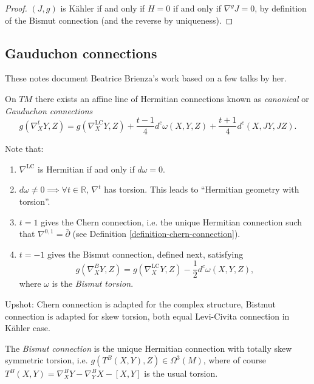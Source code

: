 \begin{proof}
$(J,g)$ is Kähler if and only if $H=0$
if and only if $\nabla^g J=0$,
by definition of the Bismut connection (and
the reverse by uniqueness).
\end{proof}




\subsection{Gauduchon connections}
\label{subsection-gauduchon-connections}

These notes document Beatrice Brienza's
work based on a few talks by her.

\begin{theorem}[Gauduchon]
\label{theorem-gauduchon-connections}
On $TM$ there exists an affine line
of Hermitian connections known as
{\it canonical} or
{\it Gauduchon connections}
$$
g(\nabla_X^tY,Z)
=g(\nabla_X^{\text{LC}}Y,Z)
+\frac{t-1}{4}
d^c\omega(X,Y,Z)
+\frac{t+1}{4}
d^c(X,JY,JZ).
$$
\end{theorem}

\noindent
Note that:
\begin{enumerate}
\item $\nabla^{\text{LC}}$ is Hermitian
if and only if $d \omega=0$.
\item $d \omega \neq 0 \implies
\forall t \in \mathbb{R}$,
$\nabla^t$ has torsion. This leads to
``Hermitian geometry with torsion''.
\item $t=1$ gives the Chern connection,
i.e. the unique Hermitian connection
such that $\nabla^{0,1}=\bar\partial$
(see Definition
\ref{definition-chern-connection}).
\item $t=-1$ gives the Bismut connection,
defined next, satisfying
$$
g(\nabla_X^BY,Z)
=g(\nabla^{\text{LC}}_XY,Z)
-\frac{1}{2}d^c\omega(X,Y,Z),
$$
where $\omega$ is the {\it Bismut torsion}.
\end{enumerate}

\noindent
Upshot: Chern connection is adapted
for the complex structure,
Bistmut connection is adapted
for skew torsion,
both equal Levi-Civita connection in
Kähler case.

\begin{definition}
\label{definition-bismut-connection}
The {\it Bismut connection} is the
unique Hermitian connection with
totally skew symmetric torsion, i.e.
$g(T^B(X,Y),Z) \in \Omega^3(M)$,
where of course
$T^B(X,Y)=\nabla^B_XY-\nabla^B_YX-[X,Y]$
is the usual torsion.
\end{definition}


